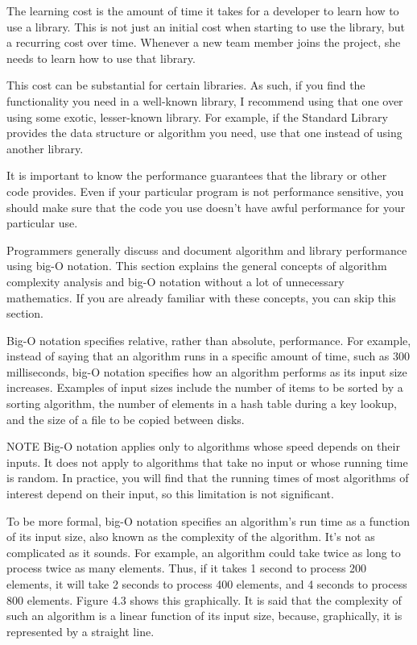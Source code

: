 
The learning cost is the amount of time it takes for a developer to learn how to use a library. This is not just an initial cost when starting to use the library, but a recurring cost over time. Whenever a new team member joins the project, she needs to learn how to use that library.

This cost can be substantial for certain libraries. As such, if you find the functionality you need in a well-known library, I recommend using that one over using some exotic, lesser-known library. For example, if the Standard Library provides the data structure or algorithm you need, use that one instead of using another library.


It is important to know the performance guarantees that the library or other code provides. Even if your particular program is not performance sensitive, you should make sure that the code you use doesn’t have awful performance for your particular use.


Programmers generally discuss and document algorithm and library performance using big-O notation. This section explains the general concepts of algorithm complexity analysis and big-O notation without a lot of unnecessary mathematics. If you are already familiar with these concepts, you can skip this section.

Big-O notation specifies relative, rather than absolute, performance. For example, instead of saying that an algorithm runs in a specific amount of time, such as 300 milliseconds, big-O notation specifies how an algorithm performs as its input size increases. Examples of input sizes include the number of items to be sorted by a sorting algorithm, the number of elements in a hash table during a key lookup, and the size of a file to be copied between disks.

\begin{myNotic}{NOTE}
Big-O notation applies only to algorithms whose speed depends on their inputs. It does not apply to algorithms that take no input or whose running time is random. In practice, you will find that the running times of most algorithms of interest depend on their input, so this limitation is not significant.
\end{myNotic}

To be more formal, big-O notation specifies an algorithm’s run time as a function of its input size, also known as the complexity of the algorithm. It’s not as complicated as it sounds. For example, an algorithm could take twice as long to process twice as many elements. Thus, if it takes 1 second to process 200 elements, it will take 2 seconds to process 400 elements, and 4 seconds to process 800 elements. Figure 4.3 shows this graphically. It is said that the complexity of such an algorithm is a linear function of its input size, because, graphically, it is represented by a straight line.

